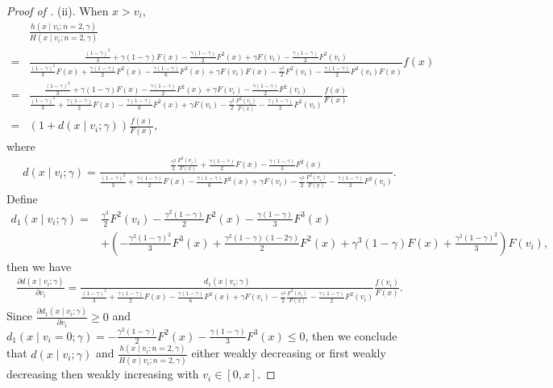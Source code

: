 \begin{proof}[{Proof of }]
\noindent (ii). When $x>v_i$, 
\begin{align*}
&\frac{h(x\mid v_i;n=2,\gamma)}{H(x\mid v_i;n=2,\gamma)}\\
=&\frac{\frac{(1-\gamma)^2}{3} + \gamma(1-\gamma) F\left(x\right) - \frac{\gamma(1-\gamma)}{2} F^2\left(x\right) + \gamma F\left(v_i\right) - \frac{\gamma (1-\gamma)}{2} F^2\left(v_i\right)}{\frac{(1-\gamma)^2}{3}F\left(x\right) + \frac{\gamma(1-\gamma)}{2} F^2\left(x\right) - \frac{\gamma(1-\gamma)}{6} F^3\left(x\right) + \gamma F\left(v_i\right)F\left(x\right) - \frac{\gamma^2}{2} F^2\left(v_i\right) - \frac{\gamma (1-\gamma)}{2} F^2\left(v_i\right) F\left(x\right)} f(x)\\
=& \frac{\frac{(1-\gamma)^2}{3} + \gamma(1-\gamma) F\left(x\right) - \frac{\gamma(1-\gamma)}{2} F^2\left(x\right) + \gamma F\left(v_i\right) - \frac{\gamma (1-\gamma)}{2} F^2\left(v_i\right)}{\frac{(1-\gamma)^2}{3} + \frac{\gamma(1-\gamma)}{2} F\left(x\right) - \frac{\gamma(1-\gamma)}{6} F^2\left(x\right) + \gamma F\left(v_i\right) - \frac{\gamma^2}{2} \frac{F^2\left(v_i\right)}{F(x)} - \frac{\gamma (1-\gamma)}{2} F^2\left(v_i\right) } \frac{f(x)}{F(x)} \\
=&\left(1 + d(x\mid v_i;\gamma) \right)\frac{f(x)}{F(x)},
\end{align*}
where
\begin{align*}
    d(x\mid v_i;\gamma) = \frac{\frac{\gamma^2}{2} \frac{F^2(v_i)}{F(x)} + \frac{\gamma(1-\gamma)}{2} F\left(x\right) - \frac{\gamma(1-\gamma)}{3}F^2(x)}{\frac{(1-\gamma)^2}{3} + \frac{\gamma(1-\gamma)}{2} F\left(x\right) - \frac{\gamma(1-\gamma)}{6} F^2\left(x\right) + \gamma F\left(v_i\right) - \frac{\gamma^2}{2} \frac{F^2\left(v_i\right)}{F(x)} - \frac{\gamma (1-\gamma)}{2} F^2\left(v_i\right) }.
\end{align*}
Define 
\begin{align*}
    d_1(x\mid v_i;\gamma) =& \frac{\gamma^3}{2}F^2(v_i) -\frac{\gamma^2(1-\gamma)}{2}F^2(x) - \frac{\gamma(1-\gamma)}{3}F^3(x) \\
    & + \left(-\frac{\gamma^2(1-\gamma)^2}{3}F^3(x) + \frac{\gamma^2(1-\gamma)(1-2\gamma)}{2}F^2(x) + \gamma^3(1-\gamma)F(x) + \frac{\gamma^2(1-\gamma)^2}{3}\right)F(v_i),
\end{align*}
then we have 
\begin{align*}
\frac{\partial d(x\mid v_i;\gamma)}{\partial v_i} = \frac{d_1(x\mid v_i;\gamma)}{\frac{(1-\gamma)^2}{3} + \frac{\gamma(1-\gamma)}{2} F\left(x\right) - \frac{\gamma(1-\gamma)}{6} F^2\left(x\right) + \gamma F\left(v_i\right) - \frac{\gamma^2}{2} \frac{F^2\left(v_i\right)}{F(x)} - \frac{\gamma (1-\gamma)}{2} F^2\left(v_i\right)} \frac{f(v_i)}{F(x)}.   
\end{align*}
Since $\frac{\partial d_1(x\mid v_i;\gamma)}{\partial v_i}\geq 0$ and $d_1(x\mid v_i=0;\gamma) = -\frac{\gamma^2(1-\gamma)}{2}F^2(x) - \frac{\gamma(1-\gamma)}{3}F^3(x) \leq 0$, then we conclude that $d(x\mid v_i;\gamma)$ and $\frac{h(x\mid v_i;n=2,\gamma)}{H(x\mid v_i;n=2,\gamma)}$
either weakly decreasing or first weakly decreasing then weakly increasing with $v_i \in[0,x]$. 


\end{proof}
